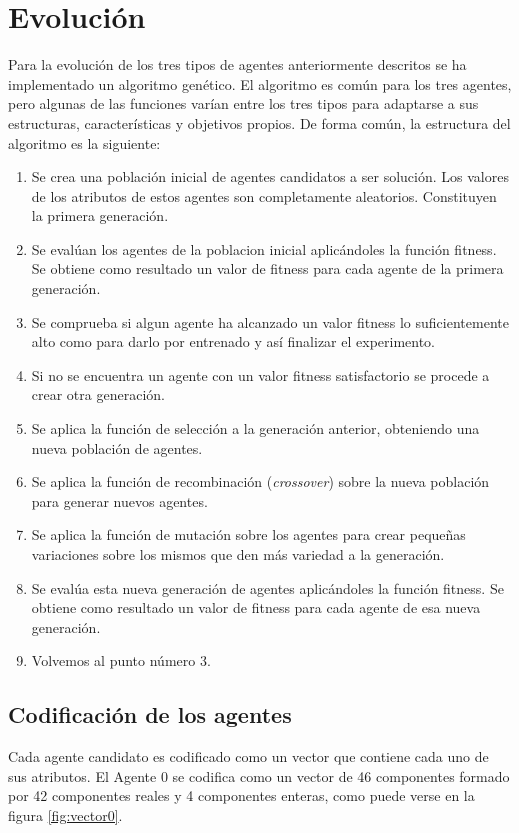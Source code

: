 \section{Evolución}
Para la evolución de los tres tipos de agentes anteriormente descritos se ha implementado un algoritmo genético. El algoritmo es común para los tres agentes, pero algunas de las funciones varían entre los tres tipos para adaptarse a sus estructuras, características y
objetivos propios. De forma común, la estructura del algoritmo es la siguiente:
\begin{enumerate}
\item{Se crea una población inicial de agentes candidatos a ser solución. Los valores de los atributos de estos agentes son completamente aleatorios. Constituyen la primera generación.}
\item{Se evalúan los agentes de la poblacion inicial aplicándoles la función fitness. Se obtiene como resultado un valor de fitness para cada agente de la primera generación.}
\item{Se comprueba si algun agente ha alcanzado un valor fitness lo suficientemente alto como para darlo por entrenado y así finalizar el experimento.}
\item{Si no se encuentra un agente con un valor fitness satisfactorio se procede a crear otra generación.}
\item{Se aplica la función de selección a la generación anterior, obteniendo una nueva población de agentes.}
\item{Se aplica la función de recombinación (\textit{crossover}) sobre la nueva población para generar nuevos agentes.}
\item{Se aplica la función de mutación sobre los agentes para crear pequeñas variaciones sobre los mismos que den más variedad a la generación.}
\item{Se evalúa esta nueva generación de agentes aplicándoles la función fitness. Se obtiene como resultado un valor de fitness para cada agente de esa nueva generación.}
\item{Volvemos al punto número 3.}
\end{enumerate}

\subsection{Codificación de los agentes}
Cada agente candidato es codificado como un vector que contiene cada uno de sus atributos. El Agente 0 se codifica como un vector de 46 componentes formado por 42 componentes reales y 4 componentes enteras, como puede verse en la figura \ref{fig:vector0}.

